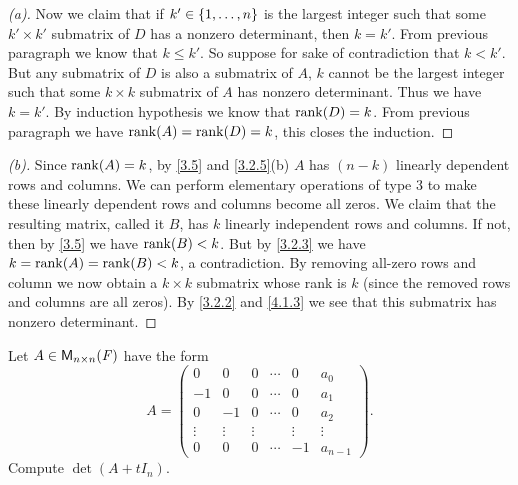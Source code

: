 \begin{proof}[(a)]
  Now we claim that if \(k' \in \left\lbrace1, \dots, n\right\rbrace\) is the largest integer such that some \(k' \times k'\) submatrix of \(D\) has a nonzero determinant, then \(k = k'\).
  From previous paragraph we know that \(k \leq k'\).
  So suppose for sake of contradiction that \(k < k'\).
  But any submatrix of \(D\) is also a submatrix of \(A\), \(k\) cannot be the largest integer such that some \(k \times k\) submatrix of \(A\) has nonzero determinant.
  Thus we have \(k = k'\).
  By induction hypothesis we know that \(\rk{D} = k\).
  From previous paragraph we have \(\rk{A} = \rk{D} = k\), this closes the induction.
\end{proof}

\begin{proof}[(b)]
  Since \(\rk{A} = k\), by \cref{3.5} and \cref{3.2.5}(b) \(A\) has \((n - k)\) linearly dependent rows and columns.
  We can perform elementary operations of type 3 to make these linearly dependent rows and columns become all zeros.
  We claim that the resulting matrix, called it \(B\), has \(k\) linearly independent rows and columns.
  If not, then by \cref{3.5} we have \(\rk{B} < k\).
  But by \cref{3.2.3} we have \(k = \rk{A} = \rk{B} < k\), a contradiction.
  By removing all-zero rows and column we now obtain a \(k \times k\) submatrix whose rank is \(k\) (since the removed rows and columns are all zeros).
  By \cref{3.2.2} and \cref{4.1.3} we see that this submatrix has nonzero determinant.
\end{proof}

\begin{ex}\label{ex:4.2.24}
  Let \(A \in \mathsf{M}_{{n} \times n}({\mathit{F}})\) have the form
  \[
    A = \begin{pmatrix}
      0      & 0      & 0      & \cdots & 0      & a_0       \\
      -1     & 0      & 0      & \cdots & 0      & a_1       \\
      0      & -1     & 0      & \cdots & 0      & a_2       \\
      \vdots & \vdots & \vdots &        & \vdots & \vdots    \\
      0      & 0      & 0      & \cdots & -1     & a_{n - 1}
    \end{pmatrix}.
  \]
  Compute \(\det(A + t I_n)\).
\end{ex}

